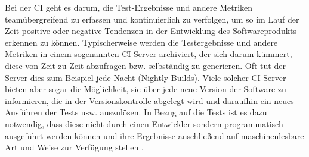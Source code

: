 Bei der \ac{CI} geht es darum, die Test-Ergebnisse und andere Metriken teamübergreifend zu erfassen und kontinuierlich zu verfolgen, um so im Lauf der Zeit positive oder negative Tendenzen in der Entwicklung des Softwareprodukts erkennen zu können. Typischerweise werden die Testergebnisse und andere Metriken in einem sogenannten \ac{CI}-Server archiviert, der sich darum kümmert, diese von Zeit zu Zeit abzufragen bzw. selbständig zu generieren. Oft tut der Server dies zum Beispiel jede Nacht (Nightly Builds). Viele solcher \ac{CI}-Server bieten aber sogar die Möglichkeit, sie über jede neue Version der Software zu informieren, die in der Versionskontrolle abgelegt wird und daraufhin ein neues Ausführen der Tests usw. auszulösen. In Bezug auf die Tests ist es dazu notwendig, dass diese nicht durch einen Entwickler sondern programmatisch ausgeführt werden können und ihre Ergebnisse anschließend auf maschinenlesbare Art und Weise zur Verfügung stellen \citep[Vgl.][]{Wiki13-06}.